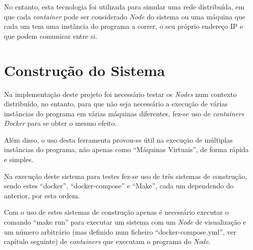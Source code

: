 No entanto, esta tecnologia foi utilizada para simular uma rede distribuída, em que cada \emph{container} pode ser considerado \emph{Node} do sistema ou uma máquina que cada um tem uma instância do programa a correr, o seu próprio endereço \acs{IP} e que podem comunicar entre si.






\section{Construção do Sistema}
\label{validacao:sec:construcao}

Na implementação deste projeto foi necessário testar os \emph{Nodes} num contexto distribuído, no entanto, para que não seja necessário a execução de várias instâncias do programa em várias máquinas diferentes, fez-se uso de \emph{containers Docker} para se obter o mesmo efeito.

Além disso, o uso desta ferramenta provou-se útil na execução de múltiplas instâncias do programa, não apenas como ``Máquinas Virtuais'', de forma rápida e simples.

Na execução deste sistema para testes fez-se uso de três sistemas de construção, sendo estes ``docker'', ``docker-compose'' e ``Make'', cada um dependendo do anterior, por esta ordem.

Com o uso de estes sistemas de construção apenas é necessário executar o comando ``make run'' para executar um sistema com um \emph{Node} de visualização e um número arbitrário (mas definido num ficheiro ``docker-compose.yml'', ver capítulo seguinte) de \emph{containers} que executam o programa do \emph{Node}.

